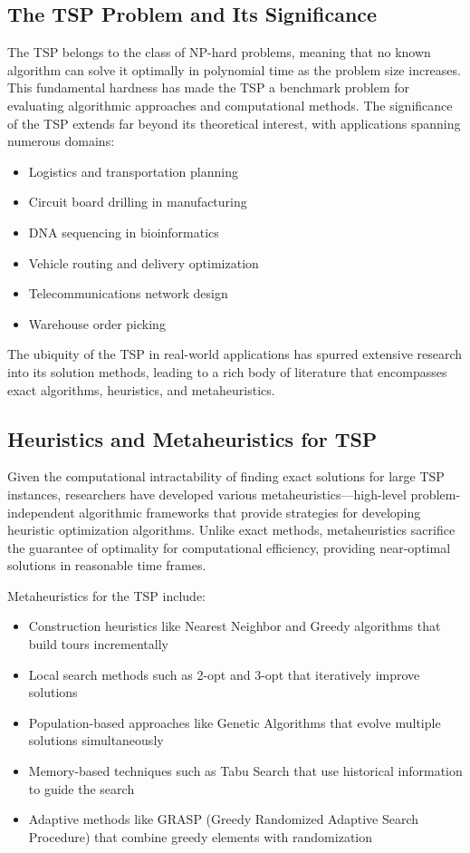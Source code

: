 \documentclass{article}
\begin{document}
\subsection{The TSP Problem and Its Significance}
The TSP belongs to the class of NP-hard problems, meaning that no known algorithm can solve it optimally in polynomial time as the problem size increases. 
This fundamental hardness has made the TSP a benchmark problem for evaluating algorithmic approaches and computational methods. The significance of the TSP extends far beyond its theoretical interest, with applications 
spanning numerous domains:
\begin{itemize}
	\item Logistics and transportation planning
	\item Circuit board drilling in manufacturing
	\item DNA sequencing in bioinformatics
	\item Vehicle routing and delivery optimization
	\item Telecommunications network design
	\item Warehouse order picking
\end{itemize}

The ubiquity of the TSP in real-world applications has spurred extensive research into its solution methods, 
leading to a rich body of literature that encompasses exact algorithms, heuristics, and metaheuristics.

\subsection{Heuristics and Metaheuristics for TSP}
Given the computational intractability of finding exact solutions for large TSP instances, researchers have developed various metaheuristics—high-level problem-independent algorithmic frameworks 
that provide strategies for developing heuristic optimization algorithms. Unlike exact methods, metaheuristics sacrifice the guarantee of optimality for computational efficiency, providing near-optimal solutions in reasonable time frames.

Metaheuristics for the TSP include:
\begin{itemize}
	\item Construction heuristics like Nearest Neighbor and Greedy algorithms that build tours incrementally
	\item Local search methods such as 2-opt and 3-opt that iteratively improve solutions
	\item Population-based approaches like Genetic Algorithms that evolve multiple solutions simultaneously
	\item Memory-based techniques such as Tabu Search that use historical information to guide the search
	\item Adaptive methods like GRASP (Greedy Randomized Adaptive Search Procedure) that combine greedy elements with randomization
\end{itemize}
\end{document}
